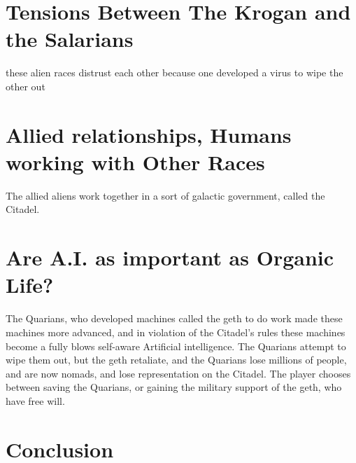 \documentclass[journal]{IEEEtran}
\begin{document}
\section{Tensions Between The Krogan and the Salarians}
these alien races distrust each other because one developed a virus to wipe the
other out

\section{Allied relationships, Humans working with Other Races}
The allied aliens work together in a sort of galactic government, called the Citadel.

\section{Are A.I. as important as Organic Life?}
The Quarians, who developed machines called the geth to do work made these
machines more advanced, and in violation of the Citadel's rules these machines
become a fully blows self-aware Artificial intelligence. The Quarians attempt to wipe them out, but the geth retaliate, and the Quarians lose millions of people, and are now nomads, and lose representation on the Citadel.
The player chooses between saving the Quarians, or gaining the military support of the geth, who have free will.

\section{Conclusion}
\lipsum[7]

\nocite{*}


\end{document}
